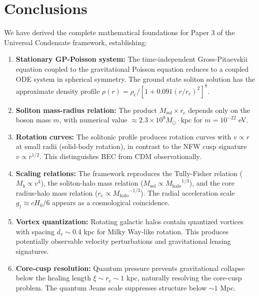 \documentclass[11pt,a4paper]{article}
\newcommand{\Msun}{\ensuremath{M_{\odot}}}
\newcommand{\Msol}{\ensuremath{M_{\mathrm{sol}}}}
\newcommand{\Mhalo}{\ensuremath{M_{\mathrm{halo}}}}
\newcommand{\rc}{\ensuremath{r_{\mathrm{c}}}}
\newcommand{\rhoc}{\ensuremath{\rho_{\mathrm{c}}}}
\newcommand{\gdagger}{\ensuremath{g_{\dagger}}}
\theoremstyle{definition}
\theoremstyle{remark}
\begin{document}
\section{Conclusions}
\label{sec:conclusions}

We have derived the complete mathematical foundations for Paper 3 of the Universal Condensate framework, establishing:

\begin{enumerate}
    \item \textbf{Stationary GP-Poisson system:} The time-independent Gross-Pitaevskii equation coupled to the gravitational Poisson equation reduces to a coupled ODE system in spherical symmetry. The ground state soliton solution has the approximate density profile $\rho(r) = \rhoc/[1 + 0.091(r/\rc)^2]^8$.

    \item \textbf{Soliton mass-radius relation:} The product $\Msol \times \rc$ depends only on the boson mass $m$, with numerical value $\approx 2.3 \times 10^9 \Msun\cdot\text{kpc}$ for $m = 10^{-22}$ eV.

    \item \textbf{Rotation curves:} The solitonic profile produces rotation curves with $v \propto r$ at small radii (solid-body rotation), in contrast to the NFW cusp signature $v \propto r^{1/2}$. This distinguishes BEC from CDM observationally.

    \item \textbf{Scaling relations:} The framework reproduces the Tully-Fisher relation ($M_b \propto v^4$), the soliton-halo mass relation ($\Msol \propto \Mhalo^{1/3}$), and the core radius-halo mass relation ($\rc \propto \Mhalo^{-1/3}$). The radial acceleration scale $\gdagger \approx cH_0/6$ appears as a cosmological coincidence.

    \item \textbf{Vortex quantization:} Rotating galactic halos contain quantized vortices with spacing $d_v \sim 0.4$ kpc for Milky Way-like rotation. This produces potentially observable velocity perturbations and gravitational lensing signatures.

    \item \textbf{Core-cusp resolution:} Quantum pressure prevents gravitational collapse below the healing length $\xi \sim \rc \sim 1$ kpc, naturally resolving the core-cusp problem. The quantum Jeans scale suppresses structure below $\sim 1$ Mpc.
\end{enumerate}
\end{document}
